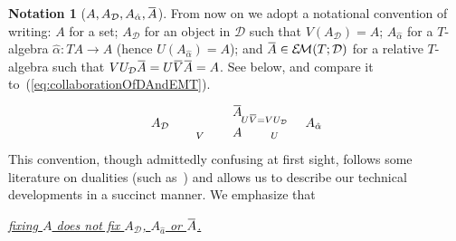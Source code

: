 \documentclass[9pt, preprint]{sigplanconf}
\theoremstyle{theorem}
\theoremstyle{definition}
\newtheorem{notation}[theorem]{Notation}
\newcommand{\cat}[1]{\mathcal{#1}}
\renewcommand{\bar}{\overbar}
\newcommand{\overbar}[1]{\mkern 1.5mu\overline{\mkern-1.5mu#1\mkern-1.5mu}\mkern 1.5mu}
\newcommand{\EM}{\mathcal{E}{\kern-.5ex}\mathcal{M}}
\begin{document}
\begin{notation}[$A, A_{\cat{D}}, A_{\hat{\alpha}},\bar{A}$]
\label{notation:theMessyNotation}
From now on we adopt a  notational convention
of writing: $A$ for a set; $A_{\cat{D}}$ for an object in $\cat{D}$ such
that $V(A_{\cat{D}})=A$; $A_{\hat{\alpha}}$ for a $T$-algebra
 $\hat{\alpha}\colon TA\to A$ (hence $U(A_{\hat{\alpha}})=A$); and
 $\bar{A}\in \EM(T; \cat{D})$ for a relative $T$-algebra such that
 $V U_{\cat{D}}\bar{A}=U\bar{V}\bar{A}=A$. See below, and compare it to~(\ref{eq:collaborationOfDAndEMT}).
 \begin{equation}\label{eq:collaborationOfDAndEMTObj}
 \vcenter{  \xymatrix@R-3em@C+2em{
     & \bar{A} \ar@{|->}[dd]^(.3){U\bar{V}=VU_{\cat{D}}} \\
     A_{\cat{D}} \ar@{|->}[rd]_-{V}
     && A_{\hat{\alpha}} \ar@{|->}[ld]^-{U} \\
     & A
   }
 }\end{equation}
 This convention, though admittedly confusing at first sight, follows some literature
 on dualities (such as~\cite{ClarkD98}) and allows us to describe our
 technical developments in a succinct  manner. We emphasize that
\begin{center}
  \underline{\emph{fixing $A$ does not fix $A_{\cat{D}}$, $A_{\hat{a}}$ or $\bar{A}$.}}
\end{center}
\end{notation}
\end{document}
